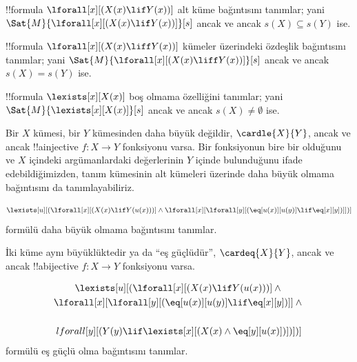 



\begin{prop}
!!{formula} $\lforall[x][(X(x) \lif Y(x))]$ alt küme bağıntısını tanımlar;
yani $\Sat{M}{\lforall[x][(X(x) \lif Y(x))]}[s]$ ancak ve ancak
$s(X)\subseteq s(Y)$ ise.
\end{prop}

\begin{prop}
!!{formula} $\lforall[x][(X(x) \liff Y(x))]$ kümeler üzerindeki özdeşlik
bağıntısını tanımlar; yani
$\Sat{M}{\lforall[x][(X(x) \liff Y(x))]}[s]$ ancak ve ancak $s(X)=s(Y)$ ise.
\end{prop}

\begin{prop}
!!{formula} $\lexists[x][X(x)]$ boş olmama özelliğini tanımlar; yani
$\Sat{M}{\lexists[x][X(x)]}[s]$ ancak ve ancak $s(X)\neq\emptyset$ ise.
\end{prop}

Bir $X$ kümesi, bir $Y$ kümesinden daha büyük değildir,
$\cardle{X}{Y}$, ancak ve ancak !!a{injective} $f\colon X\to Y$ fonksiyonu
varsa. Bir fonksiyonun bire bir olduğunu ve $X$ içindeki argümanlardaki
değerlerinin $Y$ içinde bulunduğunu ifade edebildiğimizden, tanım kümesinin
alt kümeleri üzerinde daha büyük olmama bağıntısını da tanımlayabiliriz.

\begin{prop}
\[
\lexists[u][(\lforall[x][(X(x) \lif Y(u(x)))] \land \lforall[x][\lforall[y][(\eq[u(x)][u(y)] \lif
      \eq[x][y])]])]
\]
formülü daha büyük olmama bağıntısını tanımlar.
\end{prop}

İki küme aynı büyüklüktedir ya da ``eş güçlüdür'', $\cardeq{X}{Y}$, ancak ve
ancak !!a{bijective} $f\colon X\to Y$ fonksiyonu varsa.

\begin{prop}
\begin{multline*}
  \lexists[u][(\lforall[x][(X(x) \lif Y(u(x)))] \land {}\\
    \lforall[x][\lforall[y][(\eq[u(x)][u(y)] \lif \eq[x][y])]]
  \land {} \\\\lforall[y][(Y(y) \lif \lexists[x][(X(x)
      \land \eq[y][u(x)])])])]
\end{multline*}
formülü eş güçlü olma bağıntısını tanımlar.
\end{prop}

